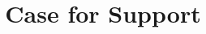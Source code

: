 \documentclass[a4paper,11point]{article}
\title{Case for Support}
\author{}
\begin{document}


\pagebreak


\end{document}
